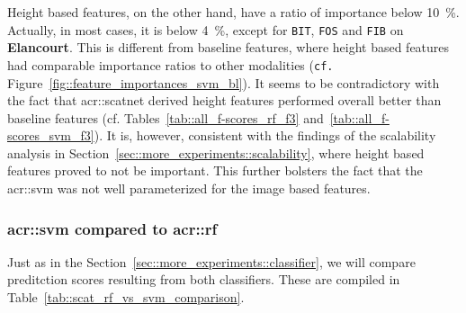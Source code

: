             Height based features, on the other hand, have a ratio of importance below \SI{10}{\percent}.
            Actually, in most cases, it is below \SI{4}{\percent}, except for \texttt{BIT}, \texttt{FOS} and \texttt{FIB} on \textbf{Elancourt}.
            This is different from baseline features, where height based features had comparable importance ratios to other modalities (\texttt{cf.} Figure~\ref{fig::feature_importances_svm_bl}).
            It seems to be contradictory with the fact that \gls{acr::scatnet} derived height features performed overall better than baseline features (cf. Tables~\ref{tab::all_f-scores_rf_f3} and~\ref{tab::all_f-scores_svm_f3}).
            It is, however, consistent with the findings of the scalability analysis in Section~\ref{sec::more_experiments::scalability}, where height based features proved to not be important.
            This further bolsters the fact that the \gls{acr::svm} was not well parameterized for the image based features.\\

        \subsubsection{\texorpdfstring{\acrshort*{acr::svm}}{SVM} compared to \texorpdfstring{\acrshort*{acr::rf}}{RF}}
            \label{subsubsec::more_experiments::richer_features::scatnet_baseline::svm_rf}
            Just as in the Section~\ref{sec::more_experiments::classifier}, we will compare preditction scores resulting from both classifiers.
            These are compiled in Table~\ref{tab::scat_rf_vs_svm_comparison}.

